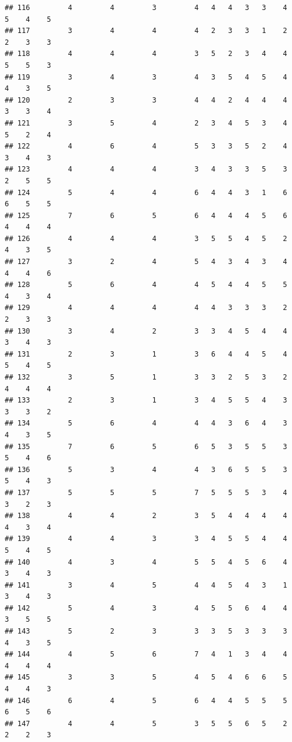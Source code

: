 \documentclass[
]{article}
\begin{document}
\begin{verbatim}
## 116         4         4         3         4   4   4   3   3    4    5    4    5
## 117         3         4         4         4   2   3   3   1    2    2    3    3
## 118         4         4         4         3   5   2   3   4    4    5    5    3
## 119         3         4         3         4   3   5   4   5    4    4    3    5
## 120         2         3         3         4   4   2   4   4    4    3    3    4
## 121         3         5         4         2   3   4   5   3    4    5    2    4
## 122         4         6         4         5   3   3   5   2    4    3    4    3
## 123         4         4         4         3   4   3   3   5    3    2    5    5
## 124         5         4         4         6   4   4   3   1    6    6    5    5
## 125         7         6         5         6   4   4   4   5    6    4    4    4
## 126         4         4         4         3   5   5   4   5    2    4    3    5
## 127         3         2         4         5   4   3   4   3    4    4    4    6
## 128         5         6         4         4   5   4   4   5    5    4    3    4
## 129         4         4         4         4   4   3   3   3    2    2    3    3
## 130         3         4         2         3   3   4   5   4    4    3    4    3
## 131         2         3         1         3   6   4   4   5    4    5    4    5
## 132         3         5         1         3   3   2   5   3    2    4    4    4
## 133         2         3         1         3   4   5   5   4    3    3    3    2
## 134         5         6         4         4   4   3   6   4    3    4    3    5
## 135         7         6         5         6   5   3   5   5    3    5    4    6
## 136         5         3         4         4   3   6   5   5    3    5    4    3
## 137         5         5         5         7   5   5   5   3    4    3    2    3
## 138         4         4         2         3   5   4   4   4    4    4    3    4
## 139         4         4         3         3   4   5   5   4    4    5    4    5
## 140         4         3         4         5   5   4   5   6    4    3    4    3
## 141         3         4         5         4   4   5   4   3    1    3    4    3
## 142         5         4         3         4   5   5   6   4    4    3    5    5
## 143         5         2         3         3   3   5   3   3    3    4    3    5
## 144         4         5         6         7   4   1   3   4    4    4    4    4
## 145         3         3         5         4   5   4   6   6    5    4    4    3
## 146         6         4         5         6   4   4   5   5    5    6    5    6
## 147         4         4         5         3   5   5   6   5    2    2    2    3

\end{verbatim}
\end{document}
